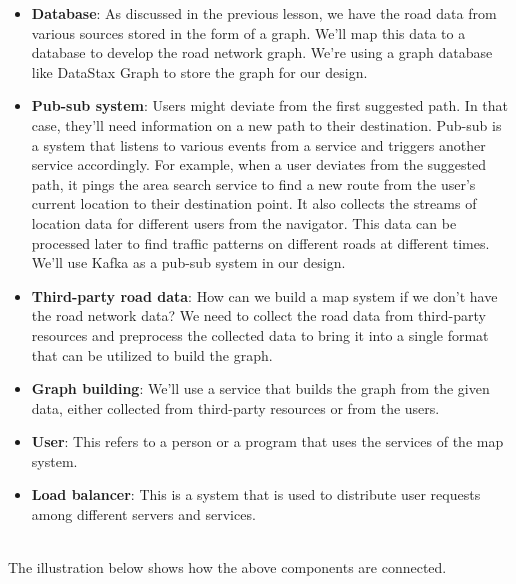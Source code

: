 \begin{itemize}
\textbf{Graph processing service}: There can be multiple paths from one place to another. The graph processing service runs the shortest path algorithm on a shorter graph based on the area spanning the source and destination points and helps us determine which path to follow.
\item
\protect{}\label{XA1MflUsZWXTwndW-WyR-}
\textbf{Database}: As discussed in the previous lesson, we have the road data from various sources stored in the form of a graph. We'll map this data to a database to develop the road network graph. We're using a graph database like DataStax Graph to store the graph for our design.
\item
\protect{}\label{aWRiNdnGldAsGDoY3Navp}
\textbf{Pub-sub system}: Users might deviate from the first suggested path. In that case, they'll need information on a new path to their destination. Pub-sub is a system that listens to various events from a service and triggers another service accordingly. For example, when a user deviates from the suggested path, it pings the area search service to find a new route from the user's current location to their destination point. It also collects the streams of location data for different users from the navigator. This data can be processed later to find traffic patterns on different roads at different times. We'll use Kafka as a pub-sub system in our design.
\item
\protect{}\label{xxLU1PQe5nrInxdxouBlI}
\textbf{Third-party road data}: How can we build a map system if we don't have the road network data? We need to collect the road data from third-party resources and preprocess the collected data to bring it into a single format that can be utilized to build the graph.
\item
\protect{}\label{l2lDgpHcVutNvb6_UTHYV}
\textbf{Graph building}: We'll use a service that builds the graph from the given data, either collected from third-party resources or from the users.
\item
\protect{}\label{EZrzSZrudGLtjjWi21eNw}
\textbf{User}: This refers to a person or a program that uses the services of the map system.
\item
\protect{}\label{sXdW3HvhhlkzPa1gbm9oD}
\textbf{Load balancer}: This is a system that is used to distribute user requests among different servers and services.
\end{itemize}
\\
The illustration below shows how the above components are connected.

